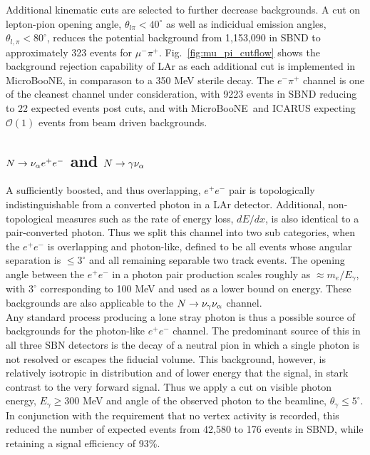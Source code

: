 \documentclass[11pt, a4paper]{article}
\newcommand{\reffig}[1]{Fig.~\ref{#1}}
\def\muboone{MicroBooNE}
\def\ster{\ensuremath N}
\begin{document}
Additional kinematic cuts are selected to further decrease backgrounds. A cut
on lepton-pion opening angle, $\theta_{l \pi} < 40^\circ$ as well as indicidual
emission angles, $\theta_{l,\pi} < 80^\circ$, reduces the potential background
from 1,153,090 in SBND to approximately 323 events for $\mu^- \pi^+$.
\reffig{fig:mu_pi_cutflow} shows the background rejection capability of LAr as
each additional cut is implemented in \muboone, in comparason to a 350 MeV
sterile decay. The $e^- \pi^+$ channel is one of the cleanest channel under
consideration, with 9223 events in SBND reducing to 22 expected events post
cuts, and with \muboone\ and ICARUS expecting $\mathcal{O}(1)$ events from
beam driven backgrounds.


\subsection{$\ster \rightarrow \nu_\alpha e^+ e^-$ and $\ster \rightarrow \gamma \nu_\alpha$ }

A sufficiently boosted, and thus overlapping, $e^+e^-$ pair is topologically
indistinguishable from a converted photon in a LAr detector. Additional,
non-topological measures such as the rate of energy loss, $dE/dx$, is also
identical to a pair-converted photon. Thus we split this channel into two sub
categories, when the $e^+e^-$ is overlapping and photon-like, defined to be all
events whose angular separation is $\leq 3^\circ$\cite{Spitz:2011wba} and all
remaining separable two track events. The opening angle between the $e^+e^-$ in
a photon pair production scales roughly as $\approx m_e/E_\gamma$, with
$3^\circ$ corresponding to 100 MeV and used as a lower bound on energy. These
backgrounds are also applicable to the $\ster \rightarrow \nu_\gamma
\nu_\alpha$ channel.\\ 

Any standard process producing a lone stray photon is thus a possible source of
backgrounds for the photon-like $e^+e^-$ channel. The predominant source of
this in all three SBN detectors is the decay of a neutral pion in which a
single photon is not resolved or escapes the fiducial volume. This background,
however, is relatively isotropic in distribution and of lower energy that the
signal, in stark contrast to the very forward signal. Thus we apply a cut on
visible photon energy, $E_\gamma \geq 300 $ MeV and angle of the observed
photon to the beamline, $\theta_\gamma \leq 5^\circ$. In conjunction with the
requirement that no vertex activity is recorded, this reduced the number of
expected events from 42,580 to 176 events in SBND, while retaining a signal
efficiency of 93\%.
\end{document}
